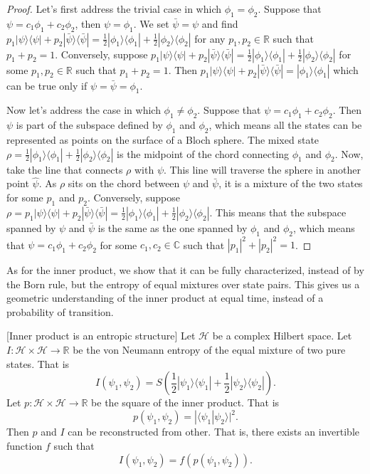 \documentclass[10pt,twocolumn, nofootinbib]{revtex4-2}
\def\>{\rangle}
\def\<{\langle}
\begin{document}
\begin{proof}
	Let's first address the trivial case in which $\phi_1 = \phi_2$. Suppose that $\psi = c_1 \phi_1 + c_2 \phi_2$, then $\psi = \phi_1$. We set $\bar{\psi} = \psi$ and find $p_1|\psi\>\<\psi| + p_2|\bar{\psi}\>\<\bar{\psi}| = \frac{1}{2}|\phi_1\>\<\phi_1| + \frac{1}{2}|\phi_2\>\<\phi_2|$ for any $p_1, p_2 \in \mathbb{R}$ such that $p_1+p_2=1$. Conversely, suppose $p_1|\psi\>\<\psi| + p_2|\bar{\psi}\>\<\bar{\psi}| = \frac{1}{2}|\phi_1\>\<\phi_1| + \frac{1}{2}|\phi_2\>\<\phi_2|$ for some $p_1, p_2 \in \mathbb{R}$ such that $p_1+p_2=1$. Then $p_1|\psi\>\<\psi| + p_2|\bar{\psi}\>\<\bar{\psi}| = |\phi_1\>\<\phi_1|$ which can be true only if $\psi=\bar{\psi}=\phi_1$.
	
	Now let's address the case in which $\phi_1 \neq \phi_2$. Suppose that $\psi = c_1 \phi_1 + c_2 \phi_2$. Then $\psi$ is part of the subspace defined by $\phi_1$ and $\phi_2$, which means all the states can be represented as points on the surface of a Bloch sphere. The mixed state $\rho=\frac{1}{2}|\phi_1\>\<\phi_1| + \frac{1}{2}|\phi_2\>\<\phi_2|$ is the midpoint of the chord connecting $\phi_1$ and $\phi_2$. Now, take the line that connects $\rho$ with $\psi$. This line will traverse the sphere in another point $\hat{\psi}$. As $\rho$ sits on the chord between $\psi$ and $\bar{\psi}$, it is a mixture of the two states for some $p_1$ and $p_2$. Conversely, suppose $\rho = p_1|\psi\>\<\psi| + p_2|\bar{\psi}\>\<\bar{\psi}| = \frac{1}{2}|\phi_1\>\<\phi_1| + \frac{1}{2}|\phi_2\>\<\phi_2|$. This means that the subspace spanned by $\psi$ and $\bar{\psi}$ is the same as the one spanned by $\phi_1$ and $\phi_2$, which means that $\psi = c_1 \phi_1 + c_2 \phi_2$ for some $c_1, c_2 \in \mathbb{C}$ such that $|p_1|^2+|p_2|^2=1$.
\end{proof}

As for the inner product, we show that it can be fully characterized, instead of by the Born rule, but the entropy of equal mixtures over state pairs. This gives us a geometric understanding of the inner product at equal time, instead of a probability of transition.

\begin{prop}\label{prop_innerProductIsEntropy}[Inner product is an entropic structure]
Let $\mathcal{H}$ be a complex Hilbert space. Let $I : \mathcal{H} \times \mathcal{H} \to \mathbb{R}$ be the von Neumann entropy of the equal mixture of two pure states. That is
\begin{equation}
	I(\psi_1, \psi_2) = S\left(\frac{1}{2}|\psi_1\>\<\psi_1| + \frac{1}{2}|\psi_2\>\<\psi_2|\right).
\end{equation}
Let $p :  \mathcal{H} \times \mathcal{H} \to \mathbb{R}$ be the square of the inner product. That is
\begin{equation}
	p(\psi_1, \psi_2) = |\<\psi_1| \psi_2\>|^2.
\end{equation}
Then $p$ and $I$ can be reconstructed from other. That is, there exists an invertible function $f$ such that
\begin{equation}
	I(\psi_1, \psi_2) = f(p(\psi_1, \psi_2)).
\end{equation}
\end{prop}
\end{document}
